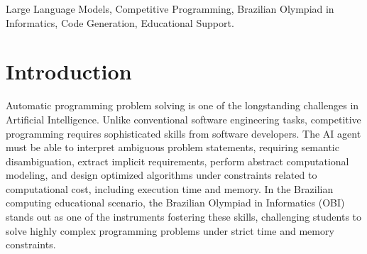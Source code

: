 \documentclass[conference]{IEEEtran}
\begin{document}
\begin{abstract}
Large Language Models (LLMs) have demonstrated increasing capabilities in code generation, yet evaluating their performance in scenarios requiring complex algorithmic reasoning remains an open challenge. Competitive programming rigorously tests Artificial Intelligence by demanding semantic disambiguation, abstract computational modeling, and code optimization under strict time and memory constraints. This article presents a comprehensive experimental evaluation of the capacity of LLMs to solve programming problems within the context of the Brazilian Olympiad in Informatics (OBI). To this end, we developed an automated experimental environment using a curated dataset of OBI problems, categorized by difficulty and algorithmic scope, integrated with an automated judge for real-time code execution and validation. The benchmarking encompassed multiple state-of-the-art models, analyzing metrics such as correct resolution rate, compilation success, and performance across difficulty tiers. Results reveal that while models achieve high mastery in basic-level problems, they face significant degradation in advanced topics involving dynamic programming and graphs. Furthermore, preliminary findings suggest that modular multi-agent architectures (such as Grok Code Fast 1) offer promising advantages in early problem decomposition, while few-shot prompting is essential to align model outputs with strict formatting and I/O constraints. By mapping the current boundaries of these tools, this study provides a solid foundation for their future integration as pedagogical support in competitive programming education.
\end{abstract}

\begin{IEEEkeywords}
Large Language Models, Competitive Programming, Brazilian Olympiad in Informatics, Code Generation, Educational Support.
\end{IEEEkeywords}

\section{Introduction}\label{sec:introduction}

Automatic programming problem solving is one of the longstanding challenges in Artificial Intelligence. Unlike conventional software engineering tasks, competitive programming requires sophisticated skills from software developers. The AI agent must be able to interpret ambiguous problem statements, requiring semantic disambiguation, extract implicit requirements, perform abstract computational modeling, and design optimized algorithms under constraints related to computational cost, including execution time and memory. In the Brazilian computing educational scenario, the Brazilian Olympiad in Informatics (OBI) stands out as one of the instruments fostering these skills, challenging students to solve highly complex programming problems under strict time and memory constraints.
\end{document}
